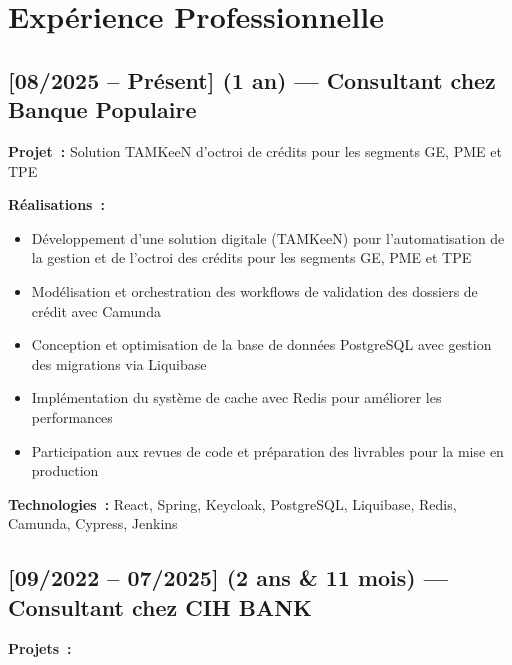 \section*{Expérience Professionnelle}

\subsection*{[08/2025 -- Présent] (1 an) --- Consultant chez Banque Populaire}
\textbf{Projet~:} Solution TAMKeeN d'octroi de crédits pour les segments GE, PME et TPE

\textbf{Réalisations~:}
\begin{itemize}
    \item Développement d'une solution digitale (TAMKeeN) pour l'automatisation de la gestion et de l'octroi des crédits pour les segments GE, PME et TPE
    \item Modélisation et orchestration des workflows de validation des dossiers de crédit avec Camunda
    \item Conception et optimisation de la base de données PostgreSQL avec gestion des migrations via Liquibase
    \item Implémentation du système de cache avec Redis pour améliorer les performances
    \item Participation aux revues de code et préparation des livrables pour la mise en production
\end{itemize}
\textbf{Technologies~:} React, Spring, Keycloak, PostgreSQL, Liquibase, Redis, Camunda, Cypress, Jenkins

\subsection*{[09/2022 -- 07/2025] (2 ans \& 11 mois) --- Consultant chez CIH BANK}
\textbf{Projets~:}

